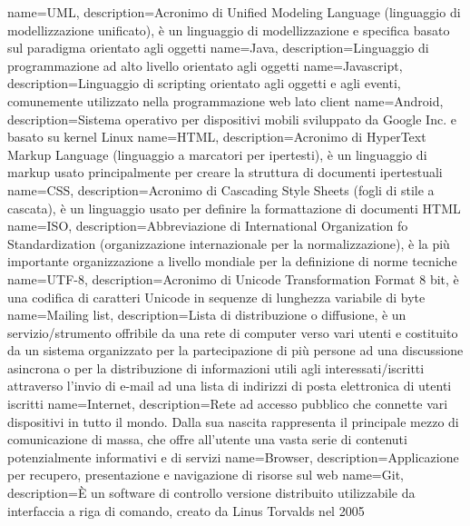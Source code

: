  {
	name=UML,
	description={Acronimo di Unified Modeling Language (linguaggio di modellizzazione
	unificato), è un linguaggio di modellizzazione e specifica basato sul paradigma
	orientato agli oggetti}
}
 {
	name=Java,
	description={Linguaggio di programmazione ad alto livello orientato agli oggetti}
}
 {
	name=Javascript,
	description={Linguaggio di scripting orientato agli oggetti e agli eventi,
	comunemente utilizzato nella programmazione web lato client}
}
 {
	name=Android,
	description={Sistema operativo per dispositivi mobili sviluppato da Google Inc. e basato su kernel Linux}
}
 {
	name=HTML,
	description={Acronimo di HyperText Markup Language (linguaggio a marcatori per
	ipertesti), è un linguaggio di markup usato principalmente per creare la
	struttura di documenti ipertestuali}
}
 {
	name=CSS,
	description={Acronimo di Cascading Style Sheets (fogli di stile a cascata), è un linguaggio usato per
	definire la formattazione di documenti HTML}
}
 {
	name=ISO,
	description={Abbreviazione di International Organization fo Standardization (organizzazione internazionale per la
	normalizzazione), è la più importante organizzazione a livello mondiale per la definizione di norme tecniche}
}
 {
	name=UTF-8,
	description={Acronimo di Unicode Transformation Format 8 bit, è una codifica di caratteri Unicode in sequenze di
	lunghezza variabile di byte}
}
 {
	name=Mailing list,
	description={Lista di distribuzione o diffusione, è un servizio/strumento offribile da una rete di computer verso
	vari utenti e costituito da un sistema organizzato per la partecipazione di più persone ad una discussione asincrona
	o per la distribuzione di informazioni utili agli interessati/iscritti attraverso l'invio di e-mail ad una lista di
	indirizzi di posta elettronica di utenti iscritti}
}
 {
	name=Internet,
	description={Rete ad accesso pubblico che connette vari dispositivi in tutto il mondo. Dalla sua nascita rappresenta
	il principale mezzo di comunicazione di massa, che offre all'utente una vasta serie di contenuti potenzialmente
	informativi e di servizi}
}
 {
	name=Browser,
	description={Applicazione per recupero, presentazione e navigazione di risorse sul web}
}
 {
	name=Git,
	description={È un software di controllo versione distribuito utilizzabile da interfaccia a riga di comando, creato da Linus Torvalds nel 2005}
}
